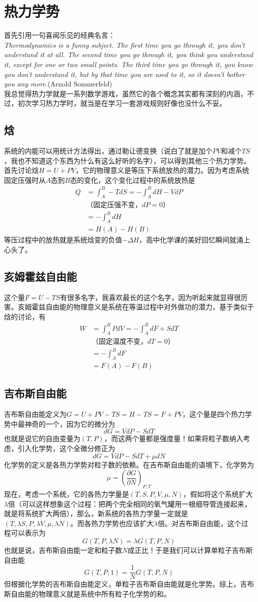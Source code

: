 \documentclass[a4paper,11pt]{ctexart}
\newcommand{\beq}{\begin{equation}}
\newcommand{\eeq}{\end{equation}}
\newcommand{\bea}{\begin{equation}\begin{aligned}}
\newcommand{\eea}{\end{aligned}\end{equation}}
\newcommand{\red}{\color{red}}
\def\pfrac#1#2#3{\left(\frac{\partial #1}{\partial #2}\right)_{#3}}
\begin{document}
\section{热力学势}
首先引用一句喜闻乐见的经典名言：
\\
\emph{
Thermodynamics is a funny subject. The first time you go through it, you
don't understand it at all. The second time you go through it, you think
you understand it, except for one or two small points. The third time you
go through it, you know you don't understand it, but by that time you are
used to it, so it doesn't bother you any more.}(Arnold Sommerfeld)
\\
我总觉得热力学就是一系列数学游戏，虽然它的各个概念其实都有深刻的内涵，不过，初次学习热力学时，就当是在学习一套游戏规则好像也没什么不妥。
\subsection{焓}
系统的内能可以用统计方法得出，通过勒让德变换（说白了就是加个$PV$和减个$TS$，我也不知道这个东西为什么有这么好听的名字），可以得到其他三个热力学势。首先讨论焓$H = U + PV$，它的物理意义是等压下{\red 系统放热的潜力}。因为考虑系统固定压强时从$A$态到$B$态的变化，这个变化过程中的系统放热是
\bea
Q &= \int_A^B -TdS = -\int_A^B dH - VdP \\
&\text{（固定压强不变，$dP = 0$）} \\
&= -\int_A^B dH \\
&= H(A) - H(B)
\eea
等压过程中的放热就是系统焓变的负值$-\Delta H$，高中化学课的美好回忆瞬间就涌上心头了。
\subsection{亥姆霍兹自由能}
这个量$F = U - TS$有很多名字，我喜欢最长的这个名字，因为听起来就显得很厉害。亥姆霍兹自由能的物理意义是系统在等温过程中{\red 对外做功的潜力}，基于类似于焓的讨论，有
\bea
W &= \int_A^B PdV = -\int_A^B dF + SdT \\
&\text{（固定温度不变，$dT = 0$）} \\
&= -\int_A^B dF \\
&= F(A) - F(B)
\eea
\subsection{吉布斯自由能}
吉布斯自由能定义为$G = U + PV - TS = H - TS = F + PV$，这个量是四个热力学势中最神奇的一个，因为它的微分为
\beq
dG = VdP - SdT
\eeq
也就是说它的自由变量为$(T,P)$，而这两个量都是强度量！如果将粒子数纳入考虑，引入化学势，这个全微分修正为
\beq
dG = VdP - SdT + \mu dN
\eeq
化学势的定义是各热力学势对粒子数的依赖。在吉布斯自由能的语境下，化学势为
\beq
\mu = \pfrac{G}{N}{P,T}
\eeq
现在，考虑一个系统，它的各热力学量是$(T,S,P,V,\mu,N)$，假如将这个系统扩大$\lambda$倍（可以这样想象这个过程：把两个完全相同的氧气罐用一根细导管连接起来，就是将系统扩大两倍），那么，新系统的各热力学量一定就是$(T,\lambda S,P,\lambda V,\mu,\lambda N)$。而各热力学势也应该扩大$\lambda$倍。对吉布斯自由能，这个过程可以表示为
\beq
G(T,P,\lambda N) = \lambda G(T,P,N)
\eeq
也就是说，{\red 吉布斯自由能一定和粒子数$N$成正比}！于是我们可以计算单粒子吉布斯自由能
\beq
G(T,P,1) = \frac{1}{N} G(T,P,N)
\eeq
但根据化学势的吉布斯自由能定义，{\red 单粒子吉布斯自由能就是化学势}。综上，吉布斯自由能的物理意义就是系统中所有粒子化学势的和。
\end{document}
